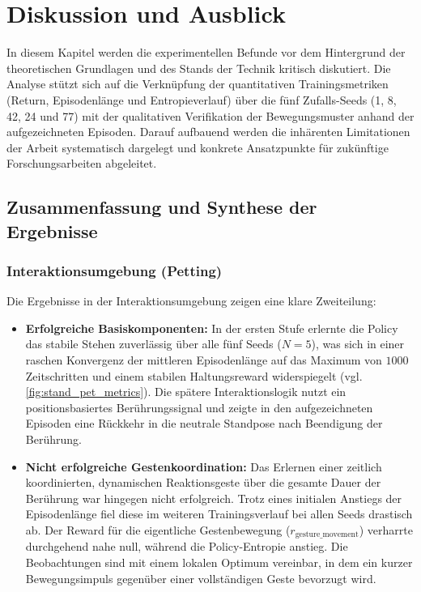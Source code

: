 \chapter{Diskussion und Ausblick}\label{ch:discussion}

In diesem Kapitel werden die experimentellen Befunde vor dem Hintergrund der theoretischen Grundlagen und des Stands der Technik kritisch diskutiert. Die Analyse stützt sich auf die Verknüpfung der quantitativen Trainingsmetriken (Return, Episodenlänge und Entropieverlauf) über die fünf Zufalls-Seeds (1, 8, 42, 24 und 77) mit der qualitativen Verifikation der Bewegungsmuster anhand der aufgezeichneten Episoden. Darauf aufbauend werden die inhärenten Limitationen der Arbeit systematisch dargelegt und konkrete Ansatzpunkte für zukünftige Forschungsarbeiten abgeleitet.

\section{Zusammenfassung und Synthese der Ergebnisse}

\subsection{Interaktionsumgebung (Petting)}
Die Ergebnisse in der Interaktionsumgebung zeigen eine klare Zweiteilung:
\begin{itemize}
	\item \textbf{Erfolgreiche Basiskomponenten:} In der ersten Stufe erlernte die Policy das stabile Stehen zuverlässig über alle fünf Seeds ($N=5$), was sich in einer raschen Konvergenz der mittleren Episodenlänge auf das Maximum von $1000$ Zeitschritten und einem stabilen Haltungsreward widerspiegelt (vgl. \autoref{fig:stand_pet_metrics}). Die spätere Interaktionslogik nutzt ein positionsbasiertes Berührungssignal und zeigte in den aufgezeichneten Episoden eine Rückkehr in die neutrale Standpose nach Beendigung der Berührung.
	\item \textbf{Nicht erfolgreiche Gestenkoordination:} Das Erlernen einer zeitlich koordinierten, dynamischen Reaktionsgeste über die gesamte Dauer der Berührung war hingegen nicht erfolgreich. Trotz eines initialen Anstiegs der Episodenlänge fiel diese im weiteren Trainingsverlauf bei allen Seeds drastisch ab. Der Reward für die eigentliche Gestenbewegung ($r_{\text{gesture\_movement}}$) verharrte durchgehend nahe null, während die Policy-Entropie anstieg. Die Beobachtungen sind mit einem lokalen Optimum vereinbar, in dem ein kurzer Bewegungsimpuls gegenüber einer vollständigen Geste bevorzugt wird.
\end{itemize}

